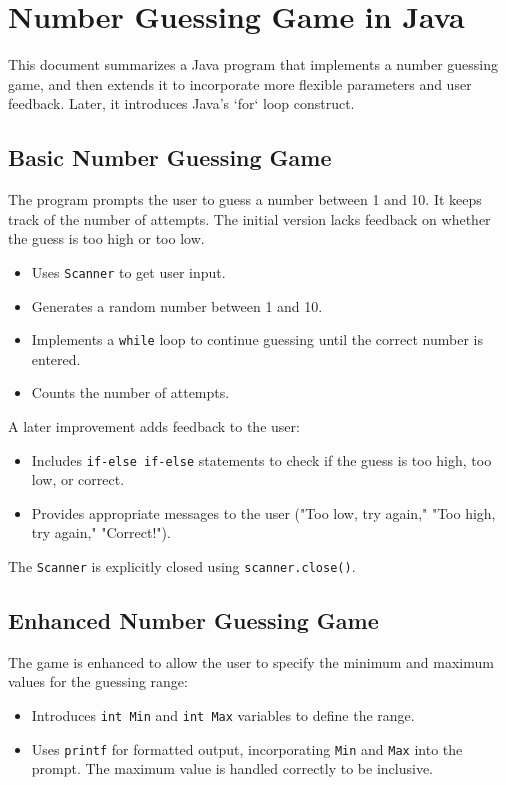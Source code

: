 \documentclass{article}
\begin{document}
\section{Number Guessing Game in Java}

This document summarizes a Java program that implements a number guessing game, and then extends it to incorporate more flexible parameters and user feedback.  Later, it introduces Java's `for` loop construct.

\subsection{Basic Number Guessing Game}

The program prompts the user to guess a number between 1 and 10.  It keeps track of the number of attempts.  The initial version lacks feedback on whether the guess is too high or too low.

\begin{itemize}
    \item Uses \texttt{Scanner} to get user input.
    \item Generates a random number between 1 and 10.
    \item Implements a \texttt{while} loop to continue guessing until the correct number is entered.
    \item Counts the number of attempts.
\end{itemize}

A later improvement adds feedback to the user:
\begin{itemize}
    \item Includes \texttt{if-else if-else} statements to check if the guess is too high, too low, or correct.
    \item Provides appropriate messages to the user ("Too low, try again," "Too high, try again," "Correct!").
\end{itemize}

The \texttt{Scanner} is explicitly closed using \texttt{scanner.close()}.

\subsection{Enhanced Number Guessing Game}

The game is enhanced to allow the user to specify the minimum and maximum values for the guessing range:

\begin{itemize}
    \item Introduces \texttt{int Min} and \texttt{int Max} variables to define the range.
    \item Uses \texttt{printf} for formatted output, incorporating \texttt{Min} and \texttt{Max} into the prompt.  The maximum value is handled correctly to be inclusive.
\end{itemize}
\end{document}
